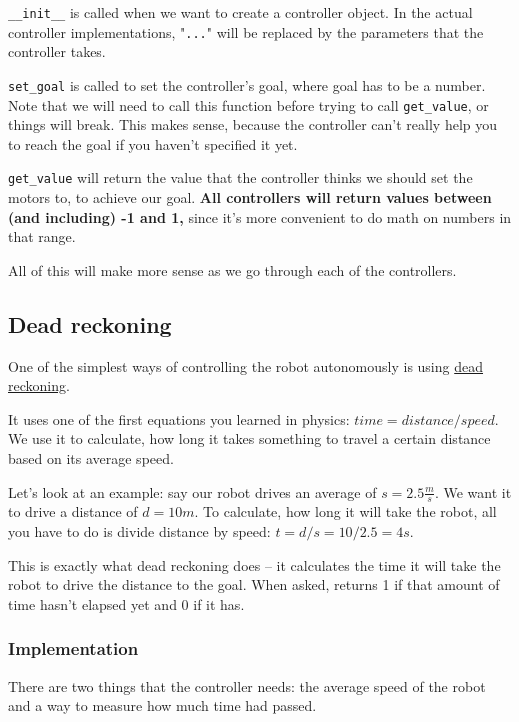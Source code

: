 \documentclass[12pt,twoside]{article}
\begin{document}
\texttt{\_\_init\_\_} is called when we want to create a controller object. In the actual controller implementations, "\texttt{...}" will be replaced by the parameters that the controller takes.

\texttt{set\_goal} is called to set the controller's goal, where goal has to be a number. Note that we will need to call this function before trying to call \texttt{get\_value}, or things will break. This makes sense, because the controller can't really help you to reach the goal if you haven't specified it yet.

\texttt{get\_value} will return the value that the controller thinks we should set the motors to, to achieve our goal. \textbf{All controllers will return values between (and including) -1 and 1,} since it's more convenient to do math on numbers in that range.

All of this will make more sense as we go through each of the controllers.




\subsection{Dead reckoning}
One of the simplest ways of controlling the robot autonomously is using \href{https://en.wikipedia.org/wiki/Dead_reckoning}{dead reckoning}.

It uses one of the first equations you learned in physics: $time = distance / speed$. We use it to calculate, how long it takes something to travel a certain distance based on its average speed.

Let's look at an example: say our robot drives an average of $s = 2.5 \frac{m}{s}$. We want it to drive a distance of $d = 10m$. To calculate, how long it will take the robot, all you have to do is divide distance by speed: $t = d/s = 10/2.5 = 4s$.

This is exactly what dead reckoning does -- it calculates the time it will take the robot to drive the distance to the goal. When asked, returns 1 if that amount of time hasn't elapsed yet and 0 if it has.


\subsubsection{Implementation}
There are two things that the controller needs: the average speed of the robot and a way to measure how much time had passed.
\end{document}
